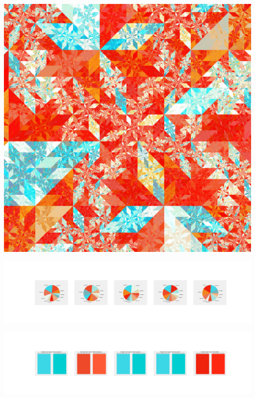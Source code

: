\documentclass[11pt]{article}
\begin{document}
\begin{landscape}
    \begin{center}
    \includegraphics[width=\textwidth]{./nbimg/file (359).jpg}
    \end{center}

    \begin{center}
    \includegraphics[width=250mm]{./nbimg/pie-288.jpg}
    \end{center}

    \begin{center}
    \includegraphics[width=250mm]{./nbimg/peak-288.jpg}
    \end{center}
    


\end{landscape}
\end{document}
